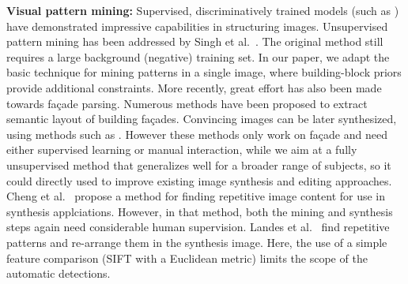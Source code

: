 \documentclass{acmtog}
\begin{document}
\textbf{Visual pattern mining:} Supervised, discriminatively trained models (such as \cite{Felzenszwalb2010DPM}) have demonstrated impressive capabilities in structuring images. Unsupervised pattern mining has been addressed by Singh et al.~. The original method still requires a large background (negative) training set. In our paper, we adapt the basic technique for mining patterns in a single image, where building-block priors provide additional constraints. More recently, great effort has also been made towards fa{\c{c}}ade parsing. Numerous methods \cite{Teboul2011SG,Martinovic2012AT,Bao2013PF} have been proposed to extract semantic layout of building fa{\c{c}}ades. Convincing images can be later synthesized, using methods such as \cite{Dai2013Facade}. However these methods only work on fa{\c{c}}ade and need either supervised learning or manual interaction, while we aim at a fully unsupervised method that generalizes well for a broader range of subjects, so it could directly used to improve existing image synthesis and editing approaches. 
Cheng et al.~\cite{Cheng2010RepFinder} propose a method for finding repetitive image content for use in synthesis applciations. However, in that method, both the mining and synthesis steps again need considerable human supervision. Landes et al.~\cite{Landes2009} find repetitive patterns and re-arrange them in the synthesis image. Here, the use of a simple feature comparison (SIFT with a Euclidean metric) limits the scope of the automatic detections.
\end{document}

